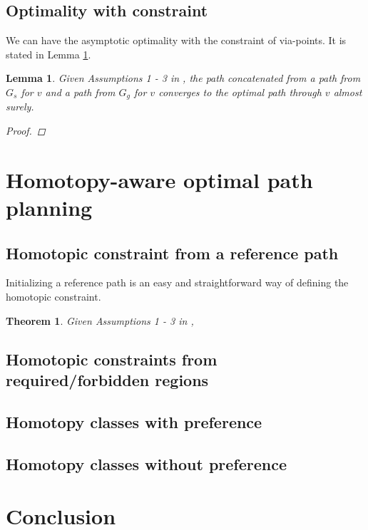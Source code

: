 \documentclass[letterpaper, 10 pt, conference]{ieeeconf}
\newtheorem{thm}{Theorem}
\newtheorem{lem}{Lemma}
\begin{document}
\subsection{Optimality with constraint}

We can have the asymptotic optimality with the constraint of via-points.
It is stated in Lemma \ref{lem:optimal_via_point}.

\begin{lem}
\label{lem:optimal_via_point}
Given Assumptions 1 - 3 in \cite{Karaman-RSS-10},
the path concatenated from a path from $ G_{s} $ for $ v $ and a path from $ G_{g} $ for $ v $ converges to the optimal path through $ v $ almost surely. 
\begin{proof}
\end{proof}
\end{lem}




\section{Homotopy-aware optimal path planning}
\label{sec:application}

\subsection{Homotopic constraint from a reference path}

Initializing a reference path is an easy and straightforward way of defining the homotopic constraint.

\begin{thm}
\label{thm:constrained_optimality}
Given Assumptions 1 - 3 in \cite{Karaman-RSS-10},
\end{thm}


\subsection{Homotopic constraints from required/forbidden regions}



\subsection{Homotopy classes with preference}

\subsection{Homotopy classes without preference}




\section{Conclusion}
\label{sec:conclusion}



\end{document}
